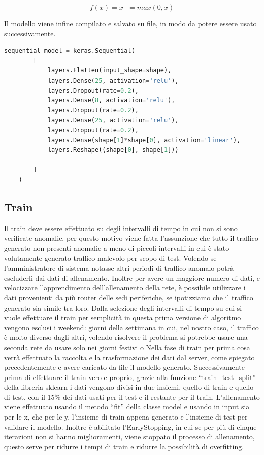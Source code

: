 \begin{equation} \label{eq:relu}
    f(x) = x^+ = max(0, x)
\end{equation}

Il modello viene infine compilato e salvato su file, in modo da potere essere usato successivamente.

\begin{lstlisting}[language=Python, label={code:get_data}, caption={Funzione usata per generale il modello della rete neurale}]
    sequential_model = keras.Sequential(
        [
            layers.Flatten(input_shape=shape),
            layers.Dense(25, activation='relu'),
            layers.Dropout(rate=0.2),
            layers.Dense(8, activation='relu'),
            layers.Dropout(rate=0.2),
            layers.Dense(25, activation='relu'),
            layers.Dropout(rate=0.2),
            layers.Dense(shape[1]*shape[0], activation='linear'),
            layers.Reshape((shape[0], shape[1]))

        ]
    )
\end{lstlisting}

\subsection{Train}
Il train deve essere effettuato su degli intervalli di tempo in cui non si sono verificate anomalie, per questo motivo viene fatta l'assunzione che tutto il traffico generato non presenti anomalie a meno di piccoli intervalli in cui è stato volutamente generato traffico malevolo per scopo di test. Volendo se l'amministratore di sistema notasse altri periodi di traffico anomalo potrà escluderli dai dati di allenamento.
Inoltre per avere un maggiore numero di dati, e velocizzare l'apprendimento dell'allenamento della rete, è possibile utilizzare i dati provenienti da più router delle sedi periferiche, se ipotizziamo che il traffico generato sia simile tra loro.
Dalla selezione degli intervalli di tempo su cui si vuole effettuare il train per semplicità in questa prima versione di algoritmo vengono esclusi i weekend: giorni della settimana in cui, nel nostro caso, il traffico è molto diverso dagli altri, volendo risolvere il problema si potrebbe usare una seconda rete da usare solo nei giorni festivi o %
Nella fase di train per prima cosa verrà effettuato la raccolta e la trasformazione dei dati dal server, come spiegato precedentemente e avere caricato da file il modello generato.
Successivamente prima di effettuare il train vero e proprio, grazie alla funzione ``train\_test\_split'' della libreria sklearn i dati vengono divisi in due insiemi, quello di train e quello di test, con il 15\% dei dati usati per il test e il restante per il train.
L'allenamento viene effettuato usando il metodo ``fit'' della classe model e usando in input sia per le x, che per le y, l'insieme di train appena generato e l'insieme di test per validare il modello. Inoltre è abilitato l'EarlyStopping, in cui se per più di cinque iterazioni non si hanno miglioramenti, viene stoppato il processo di allenamento, questo serve per ridurre i tempi di train e ridurre la possibilità di overfitting.

